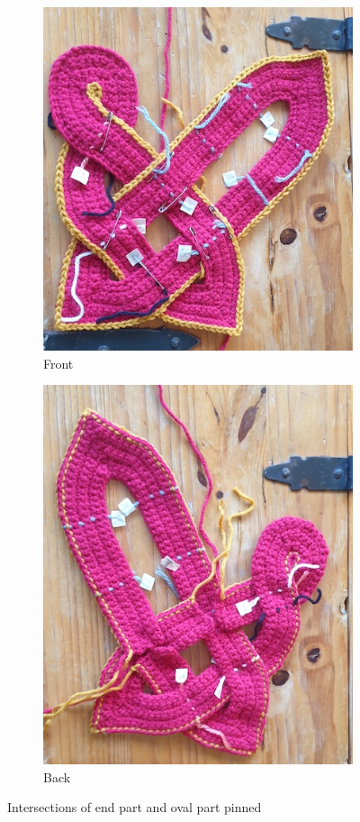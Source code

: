 \documentclass[openany]{book}
\begin{document}
\begin{figure}[H]\centering
\begin{subfigure}[t]{.45\textwidth}\centering
\includegraphics[width=.95\textwidth]{bk/weave1}
\caption{Front}
\end{subfigure}
%
\begin{subfigure}[t]{.45\textwidth}
		\centering
		\includegraphics[width=.95\textwidth]{bk/weave2}
\caption{Back}
\end{subfigure}
\caption{Intersections of end part and oval part pinned}
\end{figure}
\end{document}
